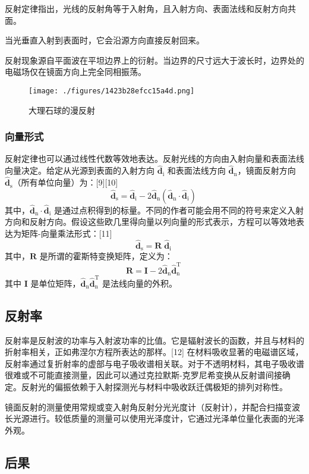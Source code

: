 反射定律指出，光线的反射角等于入射角，且入射方向、表面法线和反射方向共面。

当光垂直入射到表面时，它会沿源方向直接反射回来。

反射现象源自平面波在平坦边界上的衍射。当边界的尺寸远大于波长时，边界处的电磁场仅在镜面方向上完全同相振荡。
\begin{figure}[ht]
\centering
\texttt{[image: ./figures/1423b28efcc15a4d.png]}
\caption{大理石球的漫反射} \label{fig_JMFS_4}
\end{figure}
\subsubsection{向量形式}
反射定律也可以通过线性代数等效地表达。反射光线的方向由入射向量和表面法线向量决定。给定从光源到表面的入射方向 \(\mathbf {\hat {d}}_{\mathrm {i}}\) 和表面法线方向 \(\mathbf {\hat {d}}_{\mathrm {n}}\)，镜面反射方向 \(\mathbf {\hat {d}}_{\mathrm {s}}\)（所有单位向量）为：[9][10]
\[
\mathbf {\hat {d}}_{\mathrm {s}} = \mathbf {\hat {d}}_{\mathrm {i}} - 2 \mathbf {\hat {d}}_{\mathrm {n}} \left( \mathbf {\hat {d}}_{\mathrm {n}} \cdot \mathbf {\hat {d}}_{\mathrm {i}} \right)~
\]
其中，\(\mathbf {\hat {d}}_{\mathrm {n}} \cdot \mathbf {\hat {d}}_{\mathrm {i}}\) 是通过点积得到的标量。不同的作者可能会用不同的符号来定义入射方向和反射方向。假设这些欧几里得向量以列向量的形式表示，方程可以等效地表达为矩阵-向量乘法形式：[11]
\[
\mathbf {\hat {d}}_{\mathrm {s}} = \mathbf {R} \; \mathbf {\hat {d}}_{\mathrm {i}}~
\]
其中，\(\mathbf {R}\) 是所谓的霍斯特变换矩阵，定义为：
\[
\mathbf {R} = \mathbf {I} - 2 \mathbf {\hat {d}}_{\mathrm {n}} \mathbf {\hat {d}}_{\mathrm {n}}^{\mathrm {T}}~
\]
其中 \(\mathbf {I}\) 是单位矩阵，\(\mathbf {\hat {d}}_{\mathrm {n}} \mathbf {\hat {d}}_{\mathrm {n}}^{\mathrm {T}}\) 是法线向量的外积。
\subsection{反射率}
反射率是反射波的功率与入射波功率的比值。它是辐射波长的函数，并且与材料的折射率相关，正如弗涅尔方程所表达的那样。[12] 在材料吸收显著的电磁谱区域，反射率通过复折射率的虚部与电子吸收谱相关联。对于不透明材料，其电子吸收谱很难或不可能直接测量，因此可以通过克拉默斯-克罗尼希变换从反射谱间接确定。反射光的偏振依赖于入射探测光与材料中吸收跃迁偶极矩的排列对称性。

镜面反射的测量使用常规或变入射角反射分光光度计（反射计），并配合扫描变波长光源进行。较低质量的测量可以使用光泽度计，它通过光泽单位量化表面的光泽外观。
\subsection{后果}
